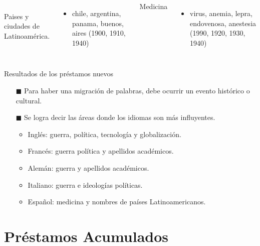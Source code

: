 \documentclass[10pt,xcolor={usenames,dvipsnames}]{beamer}
\begin{document}
\begin{frame}
{\begin{columns}
			\\
			\textcolor{Sepia}{Paises y ciudades de Latinoamérica.}
			\begin{itemize}
				\item chile, argentina, panama, buenos, aires (1900, 1910, 1940)  
			\end{itemize} 
			
			\textcolor{Sepia}{Medicina}
			\begin{itemize}
				\item virus, anemia, lepra, endovenosa, anestesia (1990, 1920, 1930, 1940)
			\end{itemize}
			
		\end{columns}
	}		
	

	
\end{frame}

\begin{frame}[fragile]{Resultados de los préstamos nuevos}
	\begin{itemize}
		\item [$\blacksquare$] Para haber una migración de palabras, debe ocurrir un evento histórico o cultural.\\
		
		\item [$\blacksquare$] Se logra decir las áreas donde los idiomas son más influyentes.
		\begin{itemize}
			\item Inglés: guerra, política, tecnología y globalización.
			\item Francés: guerra política y apellidos académicos.
			\item Alemán: guerra y apellidos académicos.
			\item Italiano: guerra e ideologías políticas.
			\item Español: medicina y nombres de países Latinoamericanos. 
		\end{itemize}
	\end{itemize}
\end{frame}


\section{Préstamos Acumulados}
\end{document}
